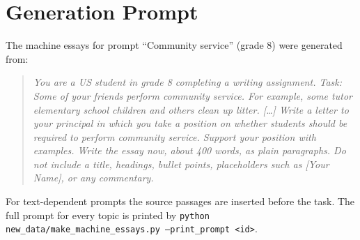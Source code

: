 \documentclass[11pt]{article}
\begin{document}
\section{Generation Prompt}
\label{app:prompt}
The machine essays for prompt ``Community service'' (grade 8) were generated from:
{\small
\begin{quote}\itshape
You are a US student in grade 8 completing a writing assignment. Task: Some of your friends perform community service. For example, some tutor elementary school children and others clean up litter. [\ldots] Write a letter to your principal in which you take a position on whether students should be required to perform community service. Support your position with examples. Write the essay now, about 400 words, as plain paragraphs. Do not include a title, headings, bullet points, placeholders such as [Your Name], or any commentary.
\end{quote}}
\noindent For text-dependent prompts the source passages are inserted before the task. The full prompt for every topic is printed by \texttt{python new\_data/make\_machine\_essays.py --print\_prompt <id>}.
\end{document}
